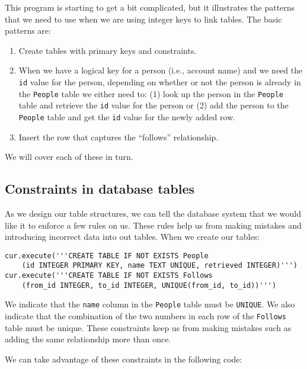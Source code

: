 \afterverb
%
This program is starting to get a bit complicated, but it illustrates
the patterns that we need to use when we are
using integer keys to link tables. The basic patterns are:

\begin{enumerate}

\item Create tables with primary keys and constraints.

\item When we have a logical key for a person (i.e., account
name) and we need the {\tt id} value for the person,
depending on whether or not the person is already
in the {\tt People} table we either need to: 
(1) look up the person in the {\tt People} table and 
retrieve the {\tt id} value for the person 
or (2) add the person to the {\tt People} table and get the 
{\tt id} value for the newly added row.

\item Insert the row that captures the ``follows'' relationship.

\end{enumerate}

We will cover each of these in turn.

\subsection{Constraints in database tables}

As we design our table structures, we can tell the database system 
that we would like it to enforce a few rules on us.   These rules
help us from making mistakes and introducing incorrect data into 
out tables.   When we create our tables:

\beforeverb
\begin{verbatim}
cur.execute('''CREATE TABLE IF NOT EXISTS People 
    (id INTEGER PRIMARY KEY, name TEXT UNIQUE, retrieved INTEGER)''')
cur.execute('''CREATE TABLE IF NOT EXISTS Follows 
    (from_id INTEGER, to_id INTEGER, UNIQUE(from_id, to_id))''')
\end{verbatim}
\afterverb
%
We indicate that the {\tt name} column in the {\tt People} table must be
{\tt UNIQUE}.   We also indicate that the combination of the two numbers
in each row of the {\tt Follows} table must be unique.  These constraints
keep us from making mistakes such as adding the same relationship more than
once.

We can take advantage of these constraints in the following code:

